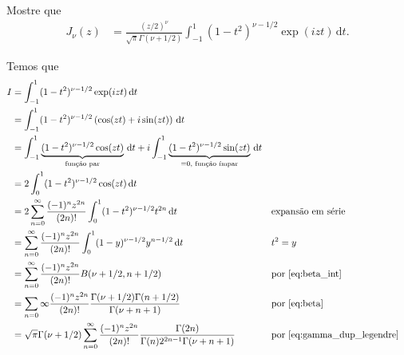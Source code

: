 \documentclass[a4paper,12pt, leqno, answers]{exam}
\begin{document}
\begin{questions}

    \question[T5 de 2011] Mostre que
    \begin{align*}
        J_\nu(z) &= \frac{(z/2)^\nu}{\sqrt{\pi} \Gamma(\nu + 1/2)} \int_{-1}^1 (1 - t^2)^{\nu - 1/2} \exp(i z t) \, \mathrm{d}t.
    \end{align*}
    \begin{solution}
        Temos que
        \begin{align*}
            I &= \int_{-1}^1 (1 - t^2)^{\nu - 1/2} \exp(i z t) \,\mathrm{d}t \\
            &= \int_{-1}^1 (1 - t^2)^{\nu - 1/2} \left( \cos(zt) + i \sin(zt) \right) \,\mathrm{d}t \\
            &= \int_{-1}^1 \underbrace{(1 - t^2)^{\nu - 1/2} \cos(zt)}_{\text{fun\c{c}\~{a}o par}} \,\mathrm{d}t + i \int_{-1}^1 \underbrace{(1 - t^2)^{\nu - 1/2} \sin(zt)}_{= 0 \text{, fun\c{c}\~{a}o \'{i}mpar}} \,\mathrm{d}t \\
            &= 2 \int_0^1 (1 - t^2)^{\nu - 1/2} \cos(zt) \,\mathrm{d}t \\
            &= 2 \sum_{n = 0}^\infty \frac{(-1)^n z^{2n}}{(2n)!} \int_0^1 (1 - t^2)^{\nu - 1/2} t^{2n} \,\mathrm{d}t && \text{expans\~{a}o em s\'{e}rie} \\
            &= \sum_{n = 0}^\infty \frac{(-1)^n z^{2n}}{(2n)!} \int_0^1 (1-y)^{\nu - 1/2} y^{n - 1/2} \,\mathrm{d}t && t^2 = y \\
            &= \sum_{n = 0}^\infty \frac{(-1)^n z^{2n}}{(2n)!} B(\nu + 1/2, n + 1/2) && \text{por \eqref{eq:beta_int}} \\
            &= \sum_{n = 0}\infty \frac{(-1)^n z^{2n}}{(2n)!} \frac{\Gamma(\nu + 1/2) \Gamma(n + 1/2)}{\Gamma(\nu + n + 1)} && \text{por \eqref{eq:beta}} \\
            &= \sqrt{\pi} \Gamma(\nu + 1/2) \sum_{n = 0}^\infty \frac{(-1)^n z^{2n}}{(2n)!} \frac{\Gamma(2n)}{\Gamma(n) 2^{2n - 1} \Gamma(\nu + n + 1)} && \text{por \eqref{eq:gamma_dup_legendre}} \\

\end{align*}
\end{solution}
\end{questions}
\end{document}
